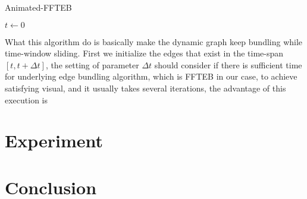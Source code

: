 \documentclass{article}
\begin{document}
\begin{algorithm}
\caption{Animated-FFTEB}\label{euclid}
\State $t \gets 0$ \\
\end{algorithm}

What this algorithm do is basically make the dynamic graph keep bundling while time-window sliding. First we initialize the edges that exist in the time-span $[t,t+\Delta t]$, the setting of parameter $\Delta t$ should consider if there is sufficient time for underlying edge bundling algorithm, which is FFTEB in our case, to achieve satisfying visual, and it usually takes several iterations, the advantage of this execution is 



\section{Experiment}


\section{Conclusion}




\end{document}
